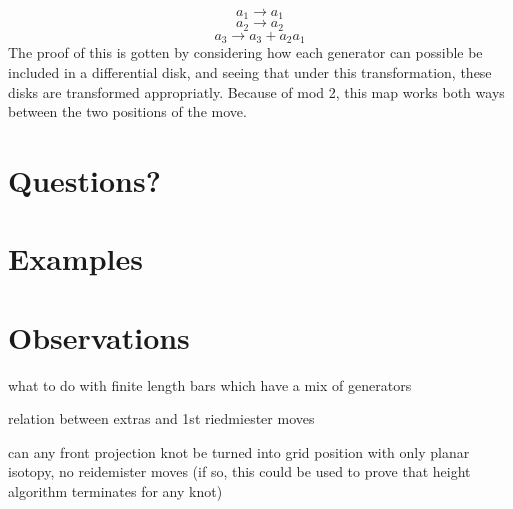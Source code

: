 \documentclass[11pt,oneside]{amsart}
\begin{document}
\[a_1 \rightarrow a_1\]
\[a_2 \rightarrow a_2\]
\[a_3 \rightarrow a_3 + a_2a_1\]
The proof of this is gotten by considering how each generator can possible be included in a differential disk, and seeing that under this transformation, these disks are transformed appropriatly. Because of mod 2, this map works both ways between the two positions of the move.






\section{Questions?}



\section{Examples}



\section{Observations}





what to do with finite length bars which have a mix of generators

relation between extras and 1st riedmiester moves

can any front projection knot be turned into grid position with only planar isotopy, no reidemister moves (if so, this could be used to prove that height algorithm terminates for any knot)
\end{document}
